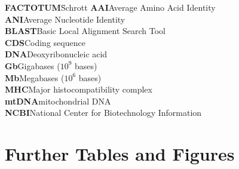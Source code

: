 \documentclass[twoside,12pt,a4paper]{report}
\begin{document}
\begin{tabbing}
\textbf{FACTOTUM}\hspace{1cm}\=Schrott\kill
\textbf{AAI}\>Average Amino Acid Identity \\
\textbf{ANI}\>Average Nucleotide Identity \\
\textbf{BLAST}\>Basic Local Alignment Search Tool \\
\textbf{CDS}\>Coding sequence\\
\textbf{DNA}\>Deoxyribonucleic acid \\
\textbf{Gb}\>Gigabases ($10^9$ bases) \\
\textbf{Mb}\>Megabases ($10^6$ bases) \\
\textbf{MHC}\>Major histocompatibility complex \\
\textbf{mtDNA}\>mitochondrial DNA \\
\textbf{NCBI}\>National Center for Biotechnology Information \\
\end{tabbing}

\cleardoublepage


\setcounter{page}{1}


\cleardoublepage


\cleardoublepage


\cleardoublepage


\cleardoublepage


\cleardoublepage


\appendix
\chapter{Further Tables and Figures} \label{chap:App}

\cleardoublepage

\end{document}
